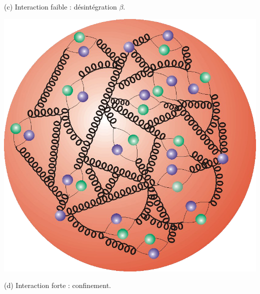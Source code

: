{\begin{center}
\vspace*{-0.25cm}
\begin{center}\normalfont\small {(c) Interaction faible : désintégration $\beta$.}\end{center}
\vspace*{-0.25cm}
\includegraphics[width=0.8\marginparwidth]{SM/quarks3.png}
\vspace*{-0.25cm}
\begin{center}\normalfont\small {(d) Interaction forte : confinement.}\end{center}
\vspace*{-0.25cm}
\end{center}
}
